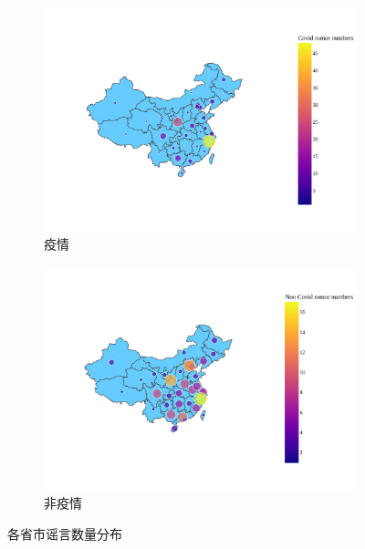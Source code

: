 \documentclass[UTF8]{ctexart}
\newcommand{\figwidth}{0.8\linewidth}
\begin{document}
\begin{figure}[!ht]
    \centering
    \begin{subfigure}[b]{0.45\textwidth}
        \centering
        \includegraphics[width=\figwidth]{../figures/covid_rumor_num_choropleth}
        \caption{疫情}
        \label{subfig:covid_rumor_num}
    \end{subfigure}
    \hfill
    \begin{subfigure}[b]{0.45\textwidth}
        \centering
        \includegraphics[width=\figwidth]{../figures/covid_no_rumor_num_choropleth}
        \caption{非疫情}
        \label{subfig:no_covid_rumor_num}
    \end{subfigure}
    \caption{各省市谣言数量分布}
    \label{fig:covid_rumor_num}
\end{figure}
\end{document}

